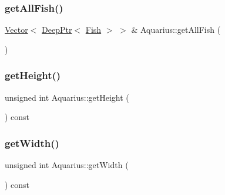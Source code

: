 \mbox{\label{classAquarius_a1bef6f16e9267d43d09d890783af1a09_a1bef6f16e9267d43d09d890783af1a09}} 
\subsubsection{\texorpdfstring{get\+All\+Fish()}{getAllFish()}}
{\footnotesize\ttfamily \hyperlink{classVector}{Vector}$<$ \hyperlink{classDeepPtr}{Deep\+Ptr}$<$ \hyperlink{classFish}{Fish} $>$ $>$ \& Aquarius\+::get\+All\+Fish (\begin{DoxyParamCaption}{ }\end{DoxyParamCaption})}

\mbox{\label{classAquarius_a9f863c5458b9f5b21b6d0257b44ba433_a9f863c5458b9f5b21b6d0257b44ba433}} 
\subsubsection{\texorpdfstring{get\+Height()}{getHeight()}}
{\footnotesize\ttfamily unsigned int Aquarius\+::get\+Height (\begin{DoxyParamCaption}{ }\end{DoxyParamCaption}) const}

\mbox{\label{classAquarius_a9cd1a0002fa16ca6f51ad4b00717c581_a9cd1a0002fa16ca6f51ad4b00717c581}} 
\subsubsection{\texorpdfstring{get\+Width()}{getWidth()}}
{\footnotesize\ttfamily unsigned int Aquarius\+::get\+Width (\begin{DoxyParamCaption}{ }\end{DoxyParamCaption}) const}

\mbox{\label{classAquarius_a64e999656f70edcfc6cedd4231638eb5_a64e999656f70edcfc6cedd4231638eb5}} 
